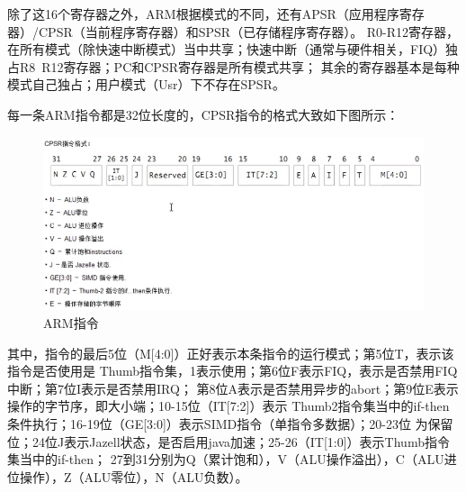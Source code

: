 除了这16个寄存器之外，ARM根据模式的不同，还有APSR（应用程序寄存器）/CPSR（当前程序寄存器）和SPSR（已存储程序寄存器）。
R0-R12寄存器，在所有模式（除快速中断模式）当中共享；快速中断（通常与硬件相关，FIQ）独占R8~R12寄存器；PC和CPSR寄存器是所有模式共享；
其余的寄存器基本是每种模式自己独占；用户模式（Usr）下不存在SPSR。

每一条ARM指令都是32位长度的，CPSR指令的格式大致如下图所示：
\begin{figure}[H]
  \centering
  \includegraphics[width=\linewidth]{arm_command.png}
  \caption{ARM指令}
  \label{fig:arm_command}
\end{figure}

其中，指令的最后5位（M[4:0]）正好表示本条指令的运行模式；第5位T，表示该指令是否使用是
Thumb指令集，1表示使用；第6位F表示FIQ，表示是否禁用FIQ中断；第7位I表示是否禁用IRQ；
第8位A表示是否禁用异步的abort；第9位E表示操作的字节序，即大小端；10-15位（IT[7:2]）表示
Thumb2指令集当中的if-then条件执行；16-19位（GE[3:0]）表示SIMD指令（单指令多数据）；20-23位
为保留位；24位J表示Jazell状态，是否启用java加速；25-26（IT[1:0]）表示Thumb指令集当中的if-then；
27到31分别为Q（累计饱和），V（ALU操作溢出），C（ALU进位操作），Z（ALU零位），N（ALU负数）。


